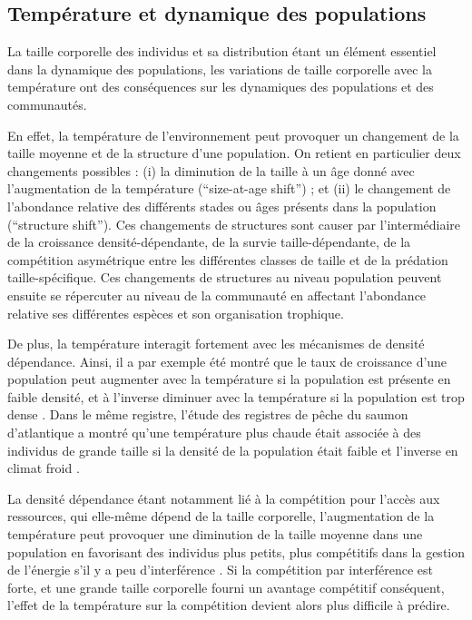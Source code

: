 \subsection{Température et dynamique des populations}

La taille corporelle des individus et sa distribution étant un élément essentiel
dans la dynamique des populations, les variations de taille corporelle avec la
température ont des conséquences sur les dynamiques des populations et des
communautés. 

En effet, la température de l'environnement peut provoquer un changement de la
taille moyenne et de la structure d'une population. On retient en particulier
deux changements possibles : (i) la diminution de la taille à un âge donné avec
l'augmentation de la température (``size-at-age shift'') ; et (ii) le
changement de l'abondance relative des différents stades ou âges présents dans
la population (``structure shift''). Ces changements de structures sont causer
par l'intermédiaire de la croissance densité-dépendante, de la survie
taille-dépendante, de la compétition asymétrique entre les différentes
classes de taille et de la prédation taille-spécifique. Ces changements de
structures au niveau population peuvent ensuite se répercuter au niveau de la
communauté en affectant l'abondance relative ses différentes espèces et son
organisation trophique. 

De plus, la température interagit fortement avec les mécanismes de densité
dépendance. Ainsi, il a par exemple été montré que le taux de croissance d'une
population peut augmenter avec la température si la population est présente en
faible densité, et à l'inverse diminuer avec la température si la population est
trop dense \autocites[chez le saumon royal][]{crozier2010a}. Dans le même
registre, l'étude des registres de pêche du saumon d'atlantique a montré qu'une
température plus chaude était associée à des individus de grande taille si la
densité de la population était faible et l'inverse en climat froid
\autocites{huusko2012a}. 

La densité dépendance étant notamment lié à la compétition pour l'accès aux
ressources, qui elle-même dépend de la taille corporelle, l'augmentation de la
température peut provoquer une diminution de la taille moyenne dans une
population en favorisant des individus plus petits, plus compétitifs dans la
gestion de l'énergie s'il y a peu d'interférence
\autocites{persson1998a,ohlberger2012a}. Si la compétition par interférence est
forte, et une grande taille corporelle fourni un avantage compétitif conséquent,
l'effet de la température sur la compétition devient alors plus difficile à
prédire.

